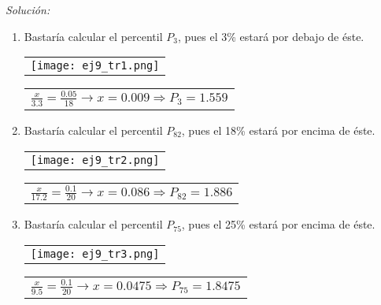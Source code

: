 \documentclass[11pt,a4paper]{article}
\theoremstyle{definition}
\begin{document}
{\color{grey}\hrulefill}

\emph{Solución:}

\begin{enumerate}[label=\emph{\alph*})]
	\item Bastaría calcular el percentil $P_3$, pues el 3\% estará por debajo de éste.



\begin{table}[!htbp]
\hspace*{1.1 cm}
\begin{tabular}{c}
\texttt{[image: ej9\_tr1.png]} \\
\end{tabular}
{
\begin{tabular}{l}
$ \frac{x}{3.3}=\frac{0.05}{18} \rightarrow x = 0.009 \Rightarrow P_3 = 1.559 $
\end{tabular}}

\end{table}


	\item Bastaría calcular el percentil $P_{82}$, pues el 18\% estará por encima de éste.

\begin{table}[!htbp]
\hspace*{1.1 cm}
\begin{tabular}{c}
\texttt{[image: ej9\_tr2.png]} \\
\end{tabular}
{
\begin{tabular}{l}
$ \frac{x}{17.2}=\frac{0.1}{20} \rightarrow x = 0.086 \Rightarrow P_{82} = 1.886 $
\end{tabular}}

\end{table}

	\item Bastaría calcular el percentil $P_{75}$, pues el 25\% estará por encima de éste.
\begin{table}[!htbp]
\hspace*{1.1 cm}
\begin{tabular}{c}
\texttt{[image: ej9\_tr3.png]} \\
\end{tabular}
{
\begin{tabular}{l}
$ \frac{x}{9.5}=\frac{0.1}{20} \rightarrow x = 0.0475 \Rightarrow P_{75} = 1.8475 $
\end{tabular}}

\end{table}
	

\end{enumerate}
\end{document}
